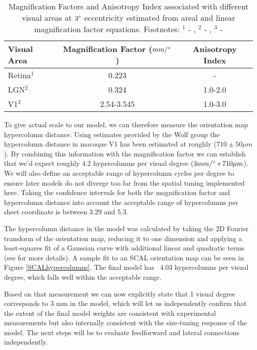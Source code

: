 \begin{table}
\centering
\begin{tabular}{l | c c}
  \hline
  \hline
  Visual Area     & Magnification Factor ($mm/\degree$) & Anisotropy Index \\
  \hline
  Retina$^1$      & 0.223                            & -                      \\
  LGN$^2$         & 0.324                             & 1.0-2.0                \\
  V1$^3$          & 2.54-3.545                       & 1.0-3.0                \\
  \hline
\end{tabular}
\caption[]%
{Magnification Factors and Anisotropy Index associated with different
  visual areas at $3\degree$ eccentricity estimated from areal and
  linear magnification factor equations. Footnotes: $^1$ -
  \cite{Perry1985}, $^2$ - \cite{Connolly1984}, $^3$ -
  \cite{VanEssen1984}}
\label{MFs}
\end{table}

To give actual scale to our model, we can therefore measure the
orientation map hypercolumn distance. Using estimates provided by the
Wolf group the hypercolumn distance in macaque V1 has been estimated
at roughly ($710 \pm 50 \mu m$). By combining this information with
the magnification factor we can establish that we'd expect roughly 4.2
hypercolumns per visual degree ($3 mm/\degree * 710 \mu m$). We will also
define an acceptable range of hypercolumn cycles per degree to ensure
later models do not diverge too far from the spatial tuning
implemented here. Taking the confidence intervals for both the
magnification factor and hypercolumn distance into account the
acceptable range of hypercolumns per sheet coordinate is between 3.29
and 5.3.

The hypercolumn distance in the model was calculated by taking the 2D
Fourier transform of the orientation map, reducing it to one dimension
and applying a least-squares fit of a Gaussian curve with additional
linear and quadratic terms (see \cite{Kaschube2010} for more
details). A sample fit to an SCAL orientation map can be seen in
Figure \ref{SCALhypercolumns}. The final model has ~4.03 hypercolumns
per visual degree, which falls well within the acceptable range.

Based on that measurement we can now explicitly state that 1 visual
degree corresponds to 3 mm in the model, which will let us
independently confirm that the extent of the final model weights are
consistent with experimental measurements but also internally
consistent with the size-tuning response of the model. The next steps
will be to evaluate feedforward and lateral connections independently.

